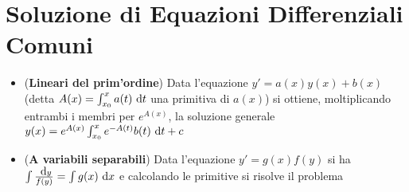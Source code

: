 \documentclass[a4paper,NoNotes,GeneralMath]{stdmdoc}
\begin{document}
	\section*{Soluzione di Equazioni Differenziali Comuni}
	\begin{itemize}
		\item ({\bf Lineari del prim'ordine}) Data l'equazione $y' = a(x)y(x) + b(x)$ (detta $A(x) = \int_{x_0}^{x} a(t) \de t$ una primitiva di $a(x)$) si ottiene, moltiplicando entrambi i membri per $e^{A(x)}$, la soluzione generale $y(x) = e^{A(x)} \int_{x_0}^{x} e^{-A(t)}b(t) \de t + c$
		\item ({\bf A variabili separabili}) Data l'equazione $y' = g(x)f(y)$ si ha $\int \frac{\de y}{f(y)} = \int g(x) \de x$ e calcolando le primitive si risolve il problema
	\end{itemize}
\end{document}
